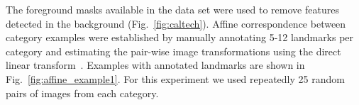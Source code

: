 \documentclass[journal]{IEEEtran}
\begin{document}
The foreground masks available in the data set were used to remove features detected
in the background (Fig.~\ref{fig:caltech}). Affine correspondence between category examples were established
by manually annotating 5-12 landmarks per category and estimating the pair-wise image
transformations using the direct linear transform~\cite{HarZis:2003}. Examples with
annotated landmarks are shown in Fig.~\ref{fig:affine_example1}.
For this experiment we used repeatedly 25 random pairs of images from each category.
%
\begin{figure}[h]
\begin{center}
~
\\

\end{center}
\end{figure}
\end{document}

